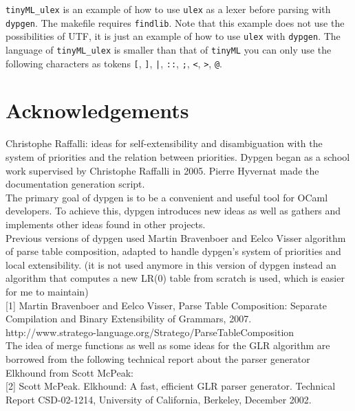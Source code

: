 \documentclass[12pt]{article}
\begin{document}
{\verb|tinyML_ulex| is an example of how to use \verb|ulex| as a lexer before parsing with \verb|dypgen|. The makefile requires \verb|findlib|. Note that this example does not use the possibilities of UTF, it is just an example of how to use \verb|ulex| with \verb|dypgen|. The language of \verb|tinyML_ulex| is smaller than that of \verb|tinyML| you can only use the following characters as tokens \verb|[|, \verb|]|, \verb$|$, \verb|::|, \verb|;|, \verb|<|, \verb|>|, \verb|@|.\\

\appendix

\section{Acknowledgements}

Christophe Raffalli: ideas for self-extensibility and disambiguation with the system of priorities and the relation between priorities. Dypgen began as a school work supervised by Christophe Raffalli in 2005. Pierre Hyvernat made the documentation generation script.\\

The primary goal of dypgen is to be a convenient and useful tool for OCaml developers. To achieve this, dypgen introduces new ideas as well as gathers and implements other ideas found in other projects.\\

Previous versions of dypgen used Martin Bravenboer and Eelco Visser algorithm of parse table composition, adapted to handle dypgen's system of priorities and local extensibility. (it is not used anymore in this version of dypgen instead an algorithm that computes a new LR(0) table from scratch is used, which is easier for me to maintain)\\

[1] Martin Bravenboer and Eelco Visser, Parse Table Composition: Separate Compilation and Binary Extensibility of Grammars, 2007.\\

http://www.stratego-language.org/Stratego/ParseTableComposition\\

The idea of merge functions as well as some ideas for the GLR algorithm are borrowed from the following technical report about the parser generator Elkhound from Scott McPeak:\\

[2] Scott McPeak. Elkhound: A fast, efficient GLR parser generator. Technical Report CSD-02-1214, University of California, Berkeley, December 2002.\\

}
\end{document}
